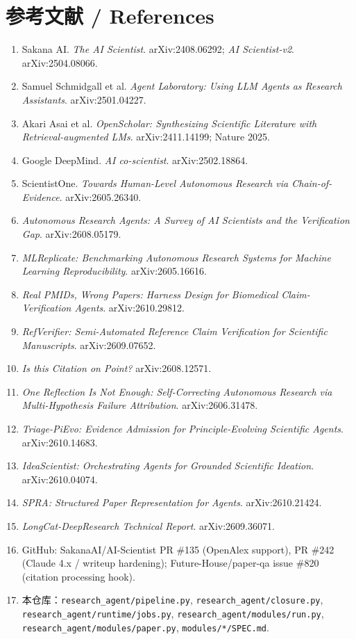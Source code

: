 \documentclass[UTF8,11pt]{ctexart}
\begin{document}
\section*{参考文献 / References}
\begin{enumerate}[leftmargin=1.4em,itemsep=2pt]
\item Sakana AI. \emph{The AI Scientist}. arXiv:2408.06292; \emph{AI Scientist-v2}. arXiv:2504.08066.
\item Samuel Schmidgall et al. \emph{Agent Laboratory: Using LLM Agents as Research Assistants}. arXiv:2501.04227.
\item Akari Asai et al. \emph{OpenScholar: Synthesizing Scientific Literature with Retrieval-augmented LMs}. arXiv:2411.14199; Nature 2025.
\item Google DeepMind. \emph{AI co-scientist}. arXiv:2502.18864.
\item ScientistOne. \emph{Towards Human-Level Autonomous Research via Chain-of-Evidence}. arXiv:2605.26340.
\item \emph{Autonomous Research Agents: A Survey of AI Scientists and the Verification Gap}. arXiv:2608.05179.
\item \emph{MLReplicate: Benchmarking Autonomous Research Systems for Machine Learning Reproducibility}. arXiv:2605.16616.
\item \emph{Real PMIDs, Wrong Papers: Harness Design for Biomedical Claim-Verification Agents}. arXiv:2610.29812.
\item \emph{RefVerifier: Semi-Automated Reference Claim Verification for Scientific Manuscripts}. arXiv:2609.07652.
\item \emph{Is this Citation on Point?} arXiv:2608.12571.
\item \emph{One Reflection Is Not Enough: Self-Correcting Autonomous Research via Multi-Hypothesis Failure Attribution}. arXiv:2606.31478.
\item \emph{Triage-PiEvo: Evidence Admission for Principle-Evolving Scientific Agents}. arXiv:2610.14683.
\item \emph{IdeaScientist: Orchestrating Agents for Grounded Scientific Ideation}. arXiv:2610.04074.
\item \emph{SPRA: Structured Paper Representation for Agents}. arXiv:2610.21424.
\item \emph{LongCat-DeepResearch Technical Report}. arXiv:2609.36071.
\item GitHub: SakanaAI/AI-Scientist PR \#135 (OpenAlex support), PR \#242 (Claude 4.x / writeup hardening); Future-House/paper-qa issue \#820 (citation processing hook).
\item 本仓库：\texttt{research\_agent/pipeline.py}, \texttt{research\_agent/closure.py}, \texttt{research\_agent/runtime/jobs.py}, \texttt{research\_agent/modules/run.py}, \texttt{research\_agent/modules/paper.py}, \texttt{modules/*/SPEC.md}.
\end{enumerate}
\end{document}
